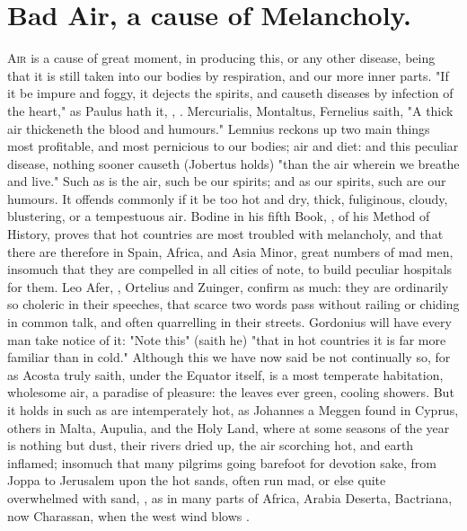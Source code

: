 \section{Bad Air, a cause of Melancholy.}

\lettrine{A}{ir} is a cause of great moment, in producing this, or any other
disease, being that it is still taken into our bodies by respiration, and our
more inner parts. "If it be impure and foggy, it dejects
the spirits, and causeth diseases by infection of the heart," as Paulus hath
it,  \Avicenna{}, . Mercurialis, Montaltus, \etc{}
Fernelius saith, "A thick air thickeneth the blood and
humours." Lemnius reckons up two main things most
profitable, and most pernicious to our bodies; air and diet: and this peculiar
disease, nothing sooner causeth (Jobertus holds) "than the
air wherein we breathe and live." Such as is the air, such
be our spirits; and as our spirits, such are our humours. It offends commonly
if it be too hot and dry, thick, fuliginous, cloudy,
blustering, or a tempestuous air. Bodine in his fifth Book,
, of his Method of History, proves
that hot countries are most troubled with melancholy, and that there are
therefore in Spain, Africa, and Asia Minor, great numbers of mad men, insomuch
that they are compelled in all cities of note, to build peculiar hospitals for
them. Leo Afer, , Ortelius and Zuinger, confirm as much: they are ordinarily so choleric
in their speeches, that scarce two words pass without railing or chiding in
common talk, and often quarrelling in their streets.
Gordonius will have every man take notice of it: "Note
this" (saith he) "that in hot countries it is far more familiar than in cold."
Although this we have now said be not continually so, for as
Acosta truly saith, under the Equator itself, is a most
temperate habitation, wholesome air, a paradise of pleasure: the leaves ever
green, cooling showers. But it holds in such as are intemperately hot, as
Johannes a Meggen found in Cyprus, others in Malta,
Aupulia, and the Holy Land, where at some seasons of the
year is nothing but dust, their rivers dried up, the air scorching hot, and
earth inflamed; insomuch that many pilgrims going barefoot for devotion sake,
from Joppa to Jerusalem upon the hot sands, often run mad, or else quite
overwhelmed with sand, , as in many parts of Africa,
Arabia Deserta, Bactriana, now Charassan, when the west wind blows .

